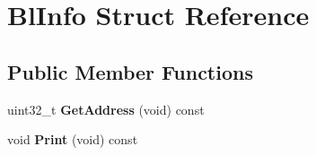 \hypertarget{struct_bl_info}{\section{Bl\-Info Struct Reference}
\label{struct_bl_info}
}
\subsection*{Public Member Functions}
\begin{DoxyCompactItemize}
\item 
\hypertarget{struct_bl_info_a54a7c7a8982f9ed99517977a9089da62}{uint32\-\_\-t {\bfseries Get\-Address} (void) const }\label{struct_bl_info_a54a7c7a8982f9ed99517977a9089da62}

\item 
\hypertarget{struct_bl_info_a4deedea65fec600c73ad4097659a4cfa}{void {\bfseries Print} (void) const }\label{struct_bl_info_a4deedea65fec600c73ad4097659a4cfa}

\end{DoxyCompactItemize}

